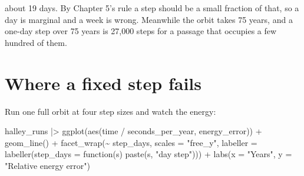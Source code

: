 \documentclass[
  10.5pt,
  letterpaper,
]{scrbook}
\newenvironment{Shaded}{\begin{snugshade}}{\end{snugshade}}
\newcommand{\AttributeTok}[1]{\textcolor[rgb]{0.00,0.00,0.00}{#1}}
\newcommand{\ControlFlowTok}[1]{\textcolor[rgb]{0.00,0.00,0.00}{#1}}
\newcommand{\DecValTok}[1]{\textcolor[rgb]{0.00,0.00,0.00}{#1}}
\newcommand{\FunctionTok}[1]{\textcolor[rgb]{0.00,0.00,0.00}{#1}}
\newcommand{\NormalTok}[1]{\textcolor[rgb]{0.00,0.00,0.00}{#1}}
\newcommand{\OtherTok}[1]{\textcolor[rgb]{0.00,0.00,0.00}{#1}}
\newcommand{\SpecialCharTok}[1]{\textcolor[rgb]{0.00,0.00,0.00}{#1}}
\newcommand{\StringTok}[1]{\textcolor[rgb]{0.00,0.00,0.00}{#1}}
\theoremstyle{definition}
\theoremstyle{plain}
\theoremstyle{remark}
\begin{document}
about 19 days. By Chapter 5's rule a step should be a small fraction of
that, so a day is marginal and a week is wrong. Meanwhile the orbit
takes 75 years, and a one-day step over 75 years is 27,000 steps for a
passage that occupies a few hundred of them.

\section{Where a fixed step fails}\label{where-a-fixed-step-fails}

Run one full orbit at four step sizes and watch the energy:

\begin{Shaded}
\end{Shaded}

\begin{Shaded}
\begin{Highlighting}[]
\NormalTok{halley\_runs }\SpecialCharTok{|\textgreater{}}
  \FunctionTok{ggplot}\NormalTok{(}\FunctionTok{aes}\NormalTok{(time }\SpecialCharTok{/}\NormalTok{ seconds\_per\_year, energy\_error)) }\SpecialCharTok{+}
  \FunctionTok{geom\_line}\NormalTok{() }\SpecialCharTok{+}
  \FunctionTok{facet\_wrap}\NormalTok{(}\SpecialCharTok{\textasciitilde{}}\NormalTok{ step\_days, }\AttributeTok{scales =} \StringTok{"free\_y"}\NormalTok{,}
             \AttributeTok{labeller =} \FunctionTok{labeller}\NormalTok{(}\AttributeTok{step\_days =} \ControlFlowTok{function}\NormalTok{(s) }\FunctionTok{paste}\NormalTok{(s, }\StringTok{"day step"}\NormalTok{))) }\SpecialCharTok{+}
  \FunctionTok{labs}\NormalTok{(}\AttributeTok{x =} \StringTok{"Years"}\NormalTok{, }\AttributeTok{y =} \StringTok{"Relative energy error"}\NormalTok{)}
\end{Highlighting}
\end{Shaded}
\end{document}
